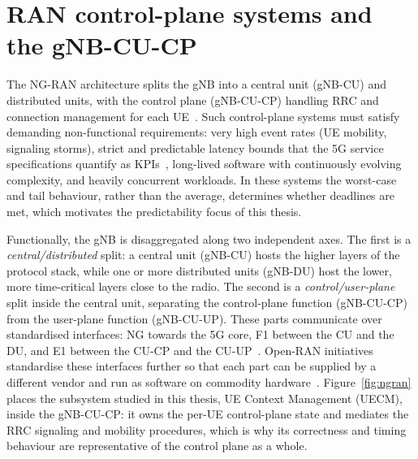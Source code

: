 \documentclass[english,twoside,openright,a4paper,censored,csm,software-track-2020]{HYthesisML}
\begin{document}
\section{RAN control-plane systems and the gNB-CU-CP}
The NG-RAN architecture splits the gNB into a central unit (gNB-CU) and distributed units,
with the control plane (gNB-CU-CP) handling RRC and connection management for each
UE~\cite{3gpp38401,3gpp38300,3gpp38331}. Such control-plane systems must satisfy demanding
non-functional requirements: very high event rates (UE mobility, signaling storms), strict
and predictable latency bounds that the 5G service specifications quantify as
KPIs~\cite{3gpp22261}, long-lived software with continuously evolving complexity,
and heavily concurrent workloads. In these systems the worst-case and tail behaviour,
rather than the average, determines whether deadlines are met, which motivates the
predictability focus of this thesis.

Functionally, the gNB is disaggregated along two independent axes. The first is a
\emph{central/distributed} split: a central unit (gNB-CU) hosts the higher layers of the
protocol stack, while one or more distributed units (gNB-DU) host the lower, more
time-critical layers close to the radio. The second is a \emph{control/user-plane} split
inside the central unit, separating the control-plane function (gNB-CU-CP) from the
user-plane function (gNB-CU-UP). These parts communicate over standardised
interfaces: NG towards the 5G core, F1 between the CU and the DU, and E1 between the CU-CP and
the CU-UP~\cite{3gpp38401,3gpp38300,3gpp38463}. Open-RAN initiatives standardise these interfaces
further so that each part can be supplied by a different vendor and run as software on
commodity hardware~\cite{polese2023oran}. Figure~\ref{fig:ngran} places the subsystem studied
in this thesis, UE Context Management (UECM), inside the gNB-CU-CP: it owns the per-UE
control-plane state and mediates the RRC signaling and mobility procedures, which is why its
correctness and timing behaviour are representative of the control plane as a whole.
\end{document}
